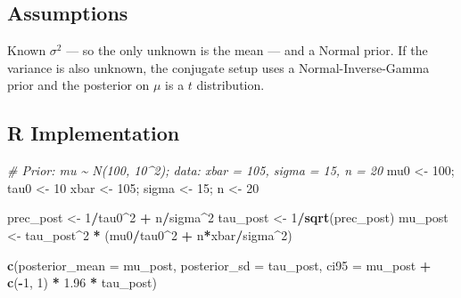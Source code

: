 \documentclass[
]{article}
\newenvironment{Shaded}{\begin{snugshade}}{\end{snugshade}}
\newcommand{\AttributeTok}[1]{\textcolor[rgb]{0.13,0.29,0.53}{#1}}
\newcommand{\CommentTok}[1]{\textcolor[rgb]{0.56,0.35,0.01}{\textit{#1}}}
\newcommand{\DecValTok}[1]{\textcolor[rgb]{0.00,0.00,0.81}{#1}}
\newcommand{\FloatTok}[1]{\textcolor[rgb]{0.00,0.00,0.81}{#1}}
\newcommand{\FunctionTok}[1]{\textcolor[rgb]{0.13,0.29,0.53}{\textbf{#1}}}
\newcommand{\NormalTok}[1]{#1}
\newcommand{\OtherTok}[1]{\textcolor[rgb]{0.56,0.35,0.01}{#1}}
\newcommand{\SpecialCharTok}[1]{\textcolor[rgb]{0.81,0.36,0.00}{\textbf{#1}}}
\begin{document}
\subsection{Assumptions}\label{assumptions}

Known \(\sigma^2\) --- so the only unknown is the mean --- and a Normal
prior. If the variance is also unknown, the conjugate setup uses a
Normal-Inverse-Gamma prior and the posterior on \(\mu\) is a \(t\)
distribution.

\subsection{R Implementation}\label{r-implementation}

\begin{Shaded}
\begin{Highlighting}[]
\CommentTok{\# Prior: mu \textasciitilde{} N(100, 10\^{}2); data: xbar = 105, sigma = 15, n = 20}
\NormalTok{mu0 }\OtherTok{\textless{}{-}} \DecValTok{100}\NormalTok{; tau0 }\OtherTok{\textless{}{-}} \DecValTok{10}
\NormalTok{xbar }\OtherTok{\textless{}{-}} \DecValTok{105}\NormalTok{; sigma }\OtherTok{\textless{}{-}} \DecValTok{15}\NormalTok{; n }\OtherTok{\textless{}{-}} \DecValTok{20}

\NormalTok{prec\_post }\OtherTok{\textless{}{-}} \DecValTok{1}\SpecialCharTok{/}\NormalTok{tau0}\SpecialCharTok{\^{}}\DecValTok{2} \SpecialCharTok{+}\NormalTok{ n}\SpecialCharTok{/}\NormalTok{sigma}\SpecialCharTok{\^{}}\DecValTok{2}
\NormalTok{tau\_post  }\OtherTok{\textless{}{-}} \DecValTok{1}\SpecialCharTok{/}\FunctionTok{sqrt}\NormalTok{(prec\_post)}
\NormalTok{mu\_post   }\OtherTok{\textless{}{-}}\NormalTok{ tau\_post}\SpecialCharTok{\^{}}\DecValTok{2} \SpecialCharTok{*}\NormalTok{ (mu0}\SpecialCharTok{/}\NormalTok{tau0}\SpecialCharTok{\^{}}\DecValTok{2} \SpecialCharTok{+}\NormalTok{ n}\SpecialCharTok{*}\NormalTok{xbar}\SpecialCharTok{/}\NormalTok{sigma}\SpecialCharTok{\^{}}\DecValTok{2}\NormalTok{)}

\FunctionTok{c}\NormalTok{(}\AttributeTok{posterior\_mean =}\NormalTok{ mu\_post,}
  \AttributeTok{posterior\_sd   =}\NormalTok{ tau\_post,}
  \AttributeTok{ci95 =}\NormalTok{ mu\_post }\SpecialCharTok{+} \FunctionTok{c}\NormalTok{(}\SpecialCharTok{{-}}\DecValTok{1}\NormalTok{, }\DecValTok{1}\NormalTok{) }\SpecialCharTok{*} \FloatTok{1.96} \SpecialCharTok{*}\NormalTok{ tau\_post)}
\end{Highlighting}
\end{Shaded}
\end{document}
